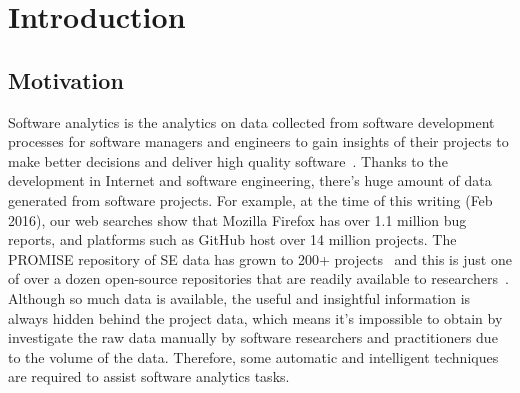 \section{Introduction}

\subsection{Motivation}

 Software analytics is the analytics on data collected from software development
 processes for software managers and engineers to gain insights of their projects
 to make better decisions and deliver high quality software~\cite{menzies2013software}.
 Thanks to the development in Internet and software engineering, there's huge amount
 of data generated from software projects. For example, at the time of this writing (Feb 2016),
 our web searches show that Mozilla Firefox has over 1.1 million bug reports, and
 platforms such as GitHub host over 14 million projects. The PROMISE repository
 of SE data has grown to 200+ projects~\cite{promise15} and this is just one of
 over a dozen open-source repositories that are readily available to researchers~\cite{rod12}.
 Although so much data is available, the useful and insightful information is always 
 hidden behind the project data, which means it's impossible to obtain by investigate the raw data manually by software
 researchers and practitioners due to the volume of the data. Therefore, some
 automatic and intelligent techniques are required to assist software analytics tasks.
 
